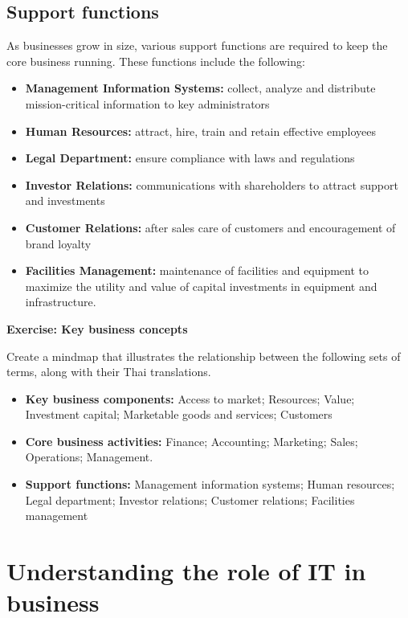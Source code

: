 \documentclass[]{book}
\providecommand{\tightlist}{%
  \setlength{\itemsep}{0pt}\setlength{\parskip}{0pt}}
\let\BeginKnitrBlock\begin \let\EndKnitrBlock\end
\begin{document}
\hypertarget{support-functions}{%
\subsection{Support functions}\label{support-functions}}

As businesses grow in size, various support functions are required to keep the core business running. These functions include the following:

\begin{itemize}
\tightlist
\item
  \textbf{Management Information Systems:} collect, analyze and distribute mission-critical information to key administrators
\item
  \textbf{Human Resources:} attract, hire, train and retain effective employees
\item
  \textbf{Legal Department:} ensure compliance with laws and regulations
\item
  \textbf{Investor Relations:} communications with shareholders to attract support and investments
\item
  \textbf{Customer Relations:} after sales care of customers and encouragement of brand loyalty
\item
  \textbf{Facilities Management:} maintenance of facilities and equipment to maximize the utility and value of capital investments in equipment and infrastructure.
\end{itemize}

\BeginKnitrBlock{rmdexercise}
\textbf{Exercise: Key business concepts}

Create a mindmap that illustrates the relationship between the following sets of terms, along with their Thai translations.

\begin{itemize}
\tightlist
\item
  \textbf{Key business components:} Access to market; Resources; Value; Investment capital; Marketable goods and services; Customers
\item
  \textbf{Core business activities:} Finance; Accounting; Marketing; Sales; Operations; Management.
\item
  \textbf{Support functions:} Management information systems; Human resources; Legal department; Investor relations; Customer relations; Facilities management
\end{itemize}
\EndKnitrBlock{rmdexercise}

\hypertarget{understanding-the-role-of-it-in-business}{%
\section{Understanding the role of IT in business}\label{understanding-the-role-of-it-in-business}}
\end{document}
